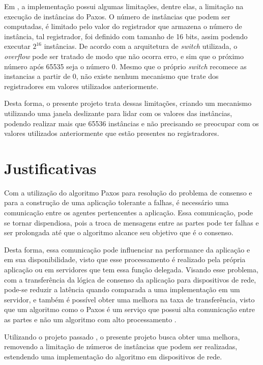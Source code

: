 \documentclass[
    12pt,
    openright, 
    oneside,
    a4paper,
    french,
    english,
    brazil
    ]{facom-ufu-abntex2}
\theoremstyle{definition}
\begin{document}
Em \cite{dang2016paxos}, a implementação possui algumas limitações, dentre elas, a limitação na execução de instâncias do Paxos. 
O número de instâncias que podem ser computadas, é limitado pelo valor do registrador que armazena o número de instância, tal registrador, 
foi definido com tamanho de 16 bits, assim podendo executar $2^{16}$ instâncias. De acordo com a arquitetura de \emph{switch} utilizada, 
o \emph{overflow} pode ser tratado de modo que não ocorra erro, e sim que o próximo número após 65535 seja o número 0. 
Mesmo que o próprio \emph{switch} recomece as instancias a partir de 0, não existe nenhum mecanismo que trate dos registradores em 
valores utilizados anteriormente. 

Desta forma, o presente projeto trata dessas limitações, criando um mecanismo utilizando uma
janela deslizante para lidar com os valores das instâncias, podendo realizar mais que
65536 instâncias e não precisando se preocupar com os valores utilizados anteriormente
que estão presentes no registradores.

\section{Justificativas}
Com a utilização do algoritmo Paxos para resolução do problema de consenso e para a 
construção de uma aplicação tolerante a falhas, é necessário uma comunicação entre os 
agentes pertencentes a aplicação. Essa comunicação, pode se tornar dispendiosa, pois 
a troca de mensagens entre as partes pode ter falhas e ser prolongada até que o 
algoritmo alcance seu objetivo que é o consenso.

Desta forma, essa comunicação pode influenciar na performance da aplicação e em 
sua disponibilidade, visto que esse processamento é realizado pela própria aplicação ou 
em servidores que tem essa função delegada. Visando esse problema, com a transferência
da lógica de consenso da aplicação para dispositivos de rede, pode-se reduzir a latência
quando comparada a uma implementação em um servidor, e também é possível obter uma melhora
na taxa de transferência, visto que um algoritmo como o Paxos é um serviço que possui
alta comunicação entre as partes e não um algoritmo com alto processamento
\cite{netchainRtt}.

Utilizando o projeto passado \cite{dang2016paxos}, o presente projeto busca obter uma melhora, removendo a limitação
de números de instâncias que podem ser realizadas, estendendo uma implementação do algoritmo em dispositivos de rede.
\end{document}
